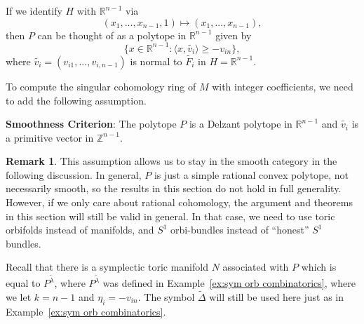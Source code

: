 \documentclass[12pt]{amsart}
\theoremstyle{definition}
\newtheorem{remark}[theorem]{Remark}
\numberwithin{equation}{section}
\begin{document}
 If we identify $H$ with ${{\mathbb{R}}}^{n-1}$ via
\[(x_{1},...,x_{n-1},1)\mapsto (x_{1},...,x_{n-1}),\]
 then $P$ can be thought
of as a polytope in ${{\mathbb{R}}}^{n-1}$ given by
\begin{equation}
 \{x\in
{{\mathbb{R}}}^{n-1}: \langle x,\tilde{v_{i}}\rangle \geq -v_{in}\},
\end{equation}
where $\tilde{v_{i}}=(v_{i1},...,v_{i,n-1})$ is normal to
$\tilde{F_{i}}$ in $H={{\mathbb{R}}}^{n-1}$.

To compute the singular cohomology ring of $M$ with integer
coefficients, we need to add the following assumption.

 {\bf Smoothness Criterion}: The polytope $P$ is a Delzant polytope in
 ${{\mathbb{R}}}^{n-1}$ and $\tilde{v_{i}}$ is a primitive vector in ${{\mathbb{Z}}}^{n-1}$.

 \begin{remark}
This assumption allows us to stay in the smooth category in the
following discussion. In general, $P$ is just a simple rational
convex polytope, not necessarily smooth, so the
 results in this section do not hold in full generality. However, if
 we only care about rational cohomology, the argument and theorems in
 this section will still be valid in general. In that case, we need
 to use toric orbifolds instead of manifolds, and $S^1$ orbi-bundles instead of ``honest'' $S^1$ bundles.
 \end{remark}

Recall that there is a symplectic toric manifold $N$ associated with
$P$ which is equal to $P^{\tilde{\lambda}}$, where
$P^{\tilde{\lambda}}$ was defined in Example~\ref{ex:sym orb
combinatorics}, where we let $k=n-1$ and $\eta_{i}=-v_{in}$. The
symbol $\tilde{\Delta}$ will still be used here just as in
Example~\ref{ex:sym orb combinatorics}.
\end{document}
